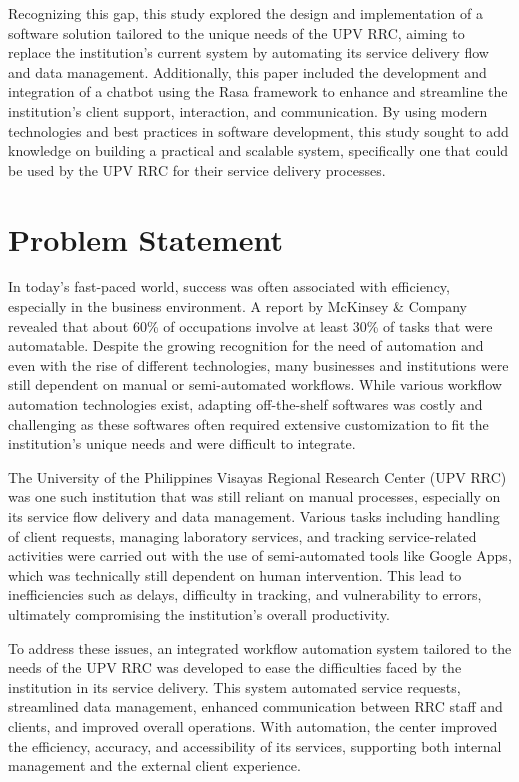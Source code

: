 Recognizing this gap, this study explored the design and implementation of a software solution tailored to the unique needs of the UPV RRC, aiming to replace the institution’s current system by automating its service delivery flow and data management. Additionally, this paper included the development and integration of a chatbot using the Rasa framework to enhance and streamline the institution’s client support, interaction, and communication. By using modern technologies and best practices in software development, this study sought to add knowledge on building a practical and scalable system, specifically one that could be used by the UPV RRC for their service delivery processes.

\section{Problem Statement}

In today’s fast-paced world, success was often associated with efficiency, especially in the business environment. A report by McKinsey \& Company \cite{manyika2017} revealed that about 60\% of occupations involve at least 30\% of tasks that were automatable. Despite the growing recognition for the need of automation and even with the rise of different technologies, many businesses and institutions were still dependent on manual or semi-automated workflows. While various workflow automation technologies exist, adapting off-the-shelf softwares was costly and challenging as these softwares often required extensive customization to fit the institution’s unique needs and were difficult to integrate. 

The University of the Philippines Visayas Regional Research Center (UPV RRC) was one such institution that was still reliant on manual processes, especially on its service flow delivery and data management. Various tasks including handling of client requests, managing laboratory services, and tracking service-related activities were carried out with the use of semi-automated tools like Google Apps, which was technically still dependent on human intervention. This lead to inefficiencies such as delays, difficulty in tracking, and vulnerability to errors, ultimately compromising the institution’s overall productivity.

To address these issues, an integrated workflow automation system tailored to the needs of the UPV RRC was developed to ease the difficulties faced by the institution in its service delivery. This system automated service requests, streamlined data management, enhanced communication between RRC staff and clients, and improved overall operations. With automation, the center improved the efficiency, accuracy, and accessibility of its services, supporting both internal management and the external client experience.

